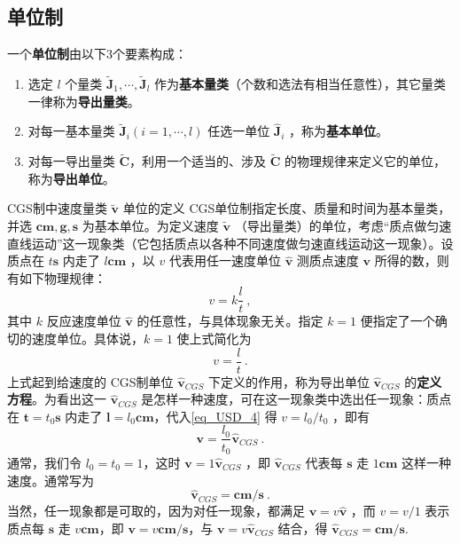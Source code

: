 \subsection{单位制}
一个\textbf{单位制}由以下3个要素构成：
\begin{enumerate}
\item 选定 $l$ 个量类 $\tilde{\boldsymbol{J}}_1,\cdots,\tilde{\boldsymbol{J}}_l$ 作为\textbf{基本量类}（个数和选法有相当任意性），其它量类一律称为\textbf{导出量类}。  
\item 对每一基本量类 $\tilde{\boldsymbol{J}}_i(i=1,\cdots,l)$ 任选一单位 $\hat{\boldsymbol{J}}_i$ ，称为\textbf{基本单位}。
\item 对每一导出量类 $\tilde{\boldsymbol{C}}$，利用一个适当的、涉及 $\tilde{\boldsymbol{C}}$ 的物理规律来定义它的单位，称为\textbf{导出单位}。
\end{enumerate}
\begin{example}{CGS制中速度量类 $\tilde{\boldsymbol{v}
}$ 单位的定义}\label{ex_USD_1}
CGS单位制指定长度、质量和时间为基本量类，并选 $\boldsymbol{cm},\boldsymbol{g},\boldsymbol{s}$ 为基本单位。为定义速度 $\tilde{\boldsymbol{v}}$ （导出量类）的单位，考虑“质点做匀速直线运动”这一现象类（它包括质点以各种不同速度做匀速直线运动这一现象）。设质点在 $t\boldsymbol{s}$ 内走了 $l\boldsymbol{cm}$ ，以 $v$ 代表用任一速度单位 $\hat{\boldsymbol{v}}$ 测质点速度 $\boldsymbol{v}$ 所得的数，则有如下物理规律：
\begin{equation}
v=k\frac{l}{t}~,
\end{equation}
其中 $k$ 反应速度单位 $\hat{\boldsymbol{v}}$ 的任意性，与具体现象无关。指定 $k=1$ 便指定了一个确切的速度单位。具体说，$k=1$ 使上式简化为
\begin{equation}\label{eq_USD_4}
v=\frac{l}{t}~.
\end{equation}
上式起到给速度的 CGS制单位 $\hat{\boldsymbol{v}}_{CGS}$ 下定义的作用，称为导出单位 $\hat{\boldsymbol{v}}_{CGS}$ 的\textbf{定义方程}。为看出这一 $\hat{\boldsymbol{v}}_{CGS}$ 是怎样一种速度，可在这一现象类中选出任一现象：质点在 $\boldsymbol{t}=t_0\boldsymbol{s}$ 内走了 $\boldsymbol{l}=l_0\boldsymbol{cm}$，代入\autoref{eq_USD_4} 得 $v=l_0/t_0$ ，即有
\begin{equation}
\boldsymbol{v}=\frac{l_0}{t_0}\hat{\boldsymbol{v}}_{CGS}~.
\end{equation}
通常，我们令 $l_0=t_0=1$，这时 $\boldsymbol{v}=1\hat{\boldsymbol{v}}_{CGS}$ ，即 $\hat{\boldsymbol{v}}_{CGS}$ 代表每 $\boldsymbol{s}$ 走 $1\boldsymbol{cm}$ 这样一种速度。通常写为
\begin{equation}
\hat{\boldsymbol{v}}_{CGS}=\boldsymbol{cm/s}~.
\end{equation}
当然，任一现象都是可取的，因为对任一现象，都满足 $\boldsymbol{v}=v\hat{\boldsymbol{v}}$ ，而 $v=v/1$ 表示质点每 $\boldsymbol{s}$ 走 $v\boldsymbol{cm}$，即 $\boldsymbol{v}=v\boldsymbol{cm/s}$，与 $\boldsymbol{v}=v\hat{\boldsymbol{v}}_{CGS}$ 结合，得 $\hat{\boldsymbol{v}}_{CGS}=\boldsymbol{cm/s}$.

\end{example}

